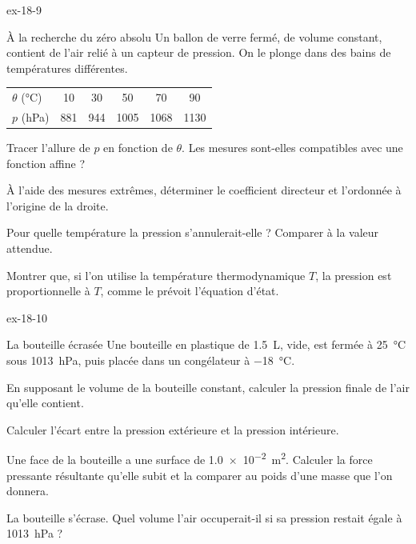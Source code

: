 \begin{blocLivre}{ex-18-9}
\begin{exercice}[2]{À la recherche du zéro absolu}
Un ballon de verre fermé, de volume constant, contient de l'air relié à un capteur de pression. On le plonge dans des
bains de températures différentes.
\begin{center}
\begin{tabular}{lccccc}
\toprule
$\theta$ (\unit{\degreeCelsius}) & 10 & 30 & 50 & 70 & 90 \\
$p$ (hPa) & 881 & 944 & \num{1005} & \num{1068} & \num{1130} \\
\bottomrule
\end{tabular}
\end{center}
\begin{questions}
\item Tracer l'allure de $p$ en fonction de $\theta$. Les mesures sont-elles compatibles avec une fonction affine ?
\item À l'aide des mesures extrêmes, déterminer le coefficient directeur et l'ordonnée à l'origine de la droite.
\item Pour quelle température la pression s'annulerait-elle ? Comparer à la valeur attendue.
\item Montrer que, si l'on utilise la température thermodynamique $T$, la pression est proportionnelle à $T$, comme le
prévoit l'équation d'état.
\end{questions}
\end{exercice}
\end{blocLivre}
\begin{blocLivre}{ex-18-10}
\begin{exercice}[2]{La bouteille écrasée}
Une bouteille en plastique de \qty{1,5}{L}, vide, est fermée à \qty{25}{\degreeCelsius} sous \qty{1013}{hPa}, puis placée dans un
congélateur à \qty{-18}{\degreeCelsius}.
\begin{questions}
\item En supposant le volume de la bouteille constant, calculer la pression finale de l'air qu'elle contient.
\item Calculer l'écart entre la pression extérieure et la pression intérieure.
\item Une face de la bouteille a une surface de \qty{1,0e-2}{m^2}. Calculer la force pressante résultante qu'elle subit et
la comparer au poids d'une masse que l'on donnera.
\item La bouteille s'écrase. Quel volume l'air occuperait-il si sa pression restait égale à \qty{1013}{hPa} ?
\end{questions}
\end{exercice}
\end{blocLivre}
